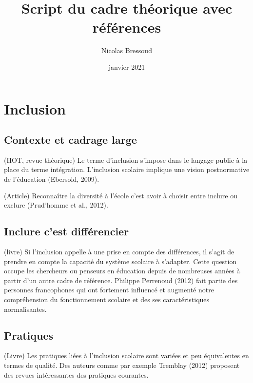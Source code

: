 \documentclass[
  french,
]{article}
\title{Script du cadre théorique avec références}
\author{Nicolas Bressoud}
\date{janvier 2021}
\begin{document}
\maketitle

\renewcommand*\contentsname{Table des matières}
{
\setcounter{tocdepth}{2}
\tableofcontents
}
\hypertarget{inclusion}{%
\section{Inclusion}\label{inclusion}}

\hypertarget{contexte-et-cadrage-large}{%
\subsection{Contexte et cadrage large}\label{contexte-et-cadrage-large}}

(HOT, revue théorique) Le terme d'inclusion s'impose dans le langage public à la place du terme intégration. L'inclusion scolaire implique une vision postnormative de l'éducation (Ebersold, 2009).

(Article) Reconnaître la diversité à l'école c'est avoir à choisir entre inclure ou exclure (Prud'homme et al., 2012).

\hypertarget{inclure-cest-diffuxe9rencier}{%
\subsection{Inclure c'est différencier}\label{inclure-cest-diffuxe9rencier}}

(livre) Si l'inclusion appelle à une prise en compte des différences, il s'agit de prendre en compte la capacité du système scolaire à s'adapter. Cette question occupe les chercheurs ou penseurs en éducation depuis de nombreuses années à partir d'un autre cadre de référence. Philippe Perrenoud (2012) fait partie des personnes francophones qui ont fortement influencé et augmenté notre compréhension du fonctionnement scolaire et des ses caractéristiques normalisantes.

\hypertarget{pratiques}{%
\subsection{Pratiques}\label{pratiques}}

(Livre) Les pratiques liées à l'inclusion scolaire sont variées et peu équivalentes en termes de qualité. Des auteurs comme par exemple Tremblay (2012) proposent des revues intéressantes des pratiques courantes.
\end{document}
